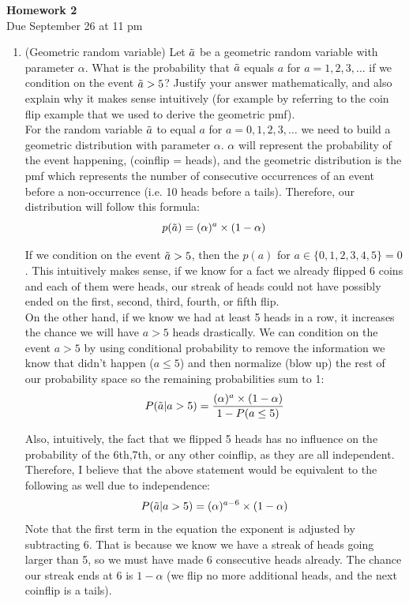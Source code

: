 \documentclass[12pt,twoside]{article}
\begin{document}
\begin{center}
{\large{\textbf{Homework 2}} } \vspace{0.2cm}\\
Due September 26 at 11 pm
\\
\end{center}

\begin{enumerate}

\item (Geometric random variable)
Let $\tilde{  a }$ be a geometric random variable with parameter $\alpha$. What is the probability that $\tilde{  a }$ equals $a$ for $a=1,2,3,\ldots$ if we condition on the event $\tilde{  a } > 5$? Justify your answer mathematically, and also explain why it makes sense intuitively (for example by referring to the coin flip example that we used to derive the geometric pmf). \\

\subitem
For the random variable $\tilde{  a }$ to equal $a$ for $a=0,1,2,3,\ldots$ we need to build a geometric distribution with parameter $\alpha$. $\alpha$ will represent the probability of the event happening, (coinflip = heads), and the geometric distribution is the pmf which represents the number of consecutive occurrences of an event before a non-occurrence (i.e. 10 heads before a tails). Therefore, our distribution will follow this formula:
$$ 
   p(\tilde{  a }) = (\alpha)^a \times (1-\alpha)
$$ 

If we condition on the event $\tilde{  a } > 5$, then the $p(a)$ for $a \in \{0,1,2,3,4,5\} = 0$. This intuitively makes sense, if we know for a fact we already flipped 6 coins and each of them were heads, our streak of heads could not have possibly ended on the first, second, third, fourth, or fifth flip. \\

On the other hand, if we know we had at least 5 heads in a row, it increases the chance we will have $a>5$ heads drastically. We can condition on the event $a>5$ by using conditional probability to remove the information we know that didn't happen ($a\leq 5$) and then normalize (blow up) the rest of our probability space so the remaining probabilities sum to 1: \\
$$
    P(\tilde{  a }|a>5) = \frac{(\alpha)^a \times (1-\alpha)}{1-P(a\leq 5)} 
$$

Also, intuitively, the fact that we flipped 5 heads has no influence on the probability of the 6th,7th, or any other coinflip, as they are all independent.  Therefore, I believe that the above statement would be equivalent to the following as well due to independence:
$$
    P(\tilde{  a }|a>5) = (\alpha)^{a-6} \times (1-\alpha)
$$
Note that the first term in the equation the exponent is adjusted by subtracting 6. That is because we know we have a streak of heads going larger than 5, so we must have made 6 consecutive heads already. The chance our streak ends at 6 is $1-\alpha$ (we flip no more additional heads, and the next coinflip is a tails).


\end{enumerate}
\end{document}
